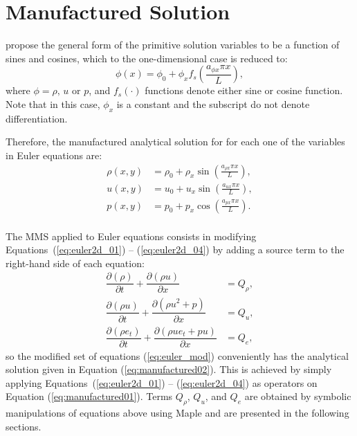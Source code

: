 \documentclass[10pt]{article}
\newcommand{\Diff}[2] {\dfrac{\partial( #1)}{\partial #2}}
\begin{document}
\section{Manufactured Solution}

\citet{Roy2002} propose the general form of the primitive solution variables to be  a function of sines and cosines, which to the one-dimensional case is reduced to:
\begin{equation}
 \label{eq:manufactured01}
  \phi (x) = \phi_0+ \phi_x f_s\left(\frac{a_{\phi x} \pi x}{L}\right),
\end{equation}
where $\phi=\rho, \,u$ or $p$, and $f_s(\cdot)$ functions denote either sine or cosine function. Note that in this case, $\phi_x$ is a constant  and the subscript do not denote differentiation.

Therefore, the manufactured analytical solution for for each one of the variables in Euler equations are:
\begin{equation}
\begin{split}
\label{eq:manufactured02}
\rho\left(x,y\right) &=  \rho_{0}+ \rho_{x} \sin\left(\frac{a_{ \rho x} \pi x}{L}\right),\\
u\left(x,y\right) &= u_{0}+u_{x} \sin\left(\frac{a_{u x} \pi x}{L}\right),\\
p\left(x,y\right) &= p_{0}+p_{x} \cos\left(\frac{a_{p x} \pi x}{L}\right).\\
\end{split}
\end{equation}


The MMS applied to Euler equations consists in modifying Equations~(\ref{eq:euler2d_01}) -- (\ref{eq:euler2d_04}) by adding a source term to the right-hand side of each equation:
\begin{equation}
 \label{eq:euler_mod}
\begin{split}
\Diff{\rho}{t} + \Diff{\rho u}{x} &= Q_\rho,\\
\Diff{\rho u}{t} + \Diff{\rho u^2 + p}{x} &= Q_u,\\
\Diff{\rho e_t}{t} + \Diff{\rho ue_t +pu}{x} &= Q_e,
\end{split}
\end{equation}
%
so the modified set of equations (\ref{eq:euler_mod}) conveniently has the analytical solution given in Equation (\ref{eq:manufactured02}). This is achieved by simply applying Equations~(\ref{eq:euler2d_01}) -- (\ref{eq:euler2d_04}) as operators on Equation (\ref{eq:manufactured01}).
%
Terms $Q_\rho$, $Q_u$,   and $Q_{e}$ are obtained by symbolic manipulations of equations above using Maple and are presented in the following sections.
\end{document}
